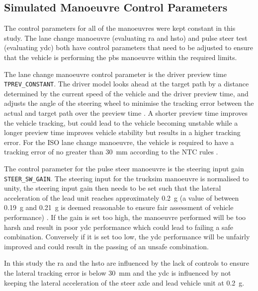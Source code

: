 \subsection{Simulated Manoeuvre Control Parameters}\label{section:discussion-limitations-control-parameters}

The control parameters for all of the manoeuvres were kept constant in this study. The lane change manoeuvre (evaluating \gls{ra} and \gls{hsto}) and pulse steer test (evaluating \gls{ydc}) both have control parameters that need to be adjusted to ensure that the vehicle is performing the \gls{pbs} manoeuvre within the required limits.

The lane change manoeuvre control parameter is the driver preview time \texttt{TPREV\_CONSTANT}. The driver model looks ahead at the target path by a distance determined by the current speed of the vehicle and the driver preview time, and adjusts the angle of the steering wheel to minimise the tracking error between the actual and target path over the preview time \cite{MechanicalSimulationHelpFileDriverControls2017}. A shorter preview time improves the vehicle tracking, but could lead to the vehicle becoming unstable while a longer preview time improves vehicle stability but results in a higher tracking error. For the ISO lane change manoeuvre, the vehicle is required to have a tracking error of no greater than 30~mm according to the NTC rules \cite{NationalTransportCommission2008}.

The control parameter for the pulse steer manoeuvre is the steering input gain \texttt{STEER\_SW\_GAIN}. The steering input for the \gls{trucksim} manoeuvre is normalised to unity, the steering input gain then needs to be set such that the lateral acceleration of the lead unit reaches approximately 0.2~g (a value of between 0.19~g and 0.21~g is deemed reasonable to ensure fair assessment of vehicle performance) \cite{MechanicalSimulationTechMemoPBS2017}. If the gain is set too high, the manoeuvre performed will be too harsh and result in poor \gls{ydc} performance which could lead to failing a safe combination. Conversely if it is set too low, the \gls{ydc} performance will be unfairly improved and could result in the passing of an unsafe combination.

In this study the \gls{ra} and the \gls{hsto} are influenced by the lack of controls to ensure the lateral tracking error is below 30~mm and the \gls{ydc} is influenced by not keeping the lateral acceleration of the steer axle and lead vehicle unit at 0.2~g.

